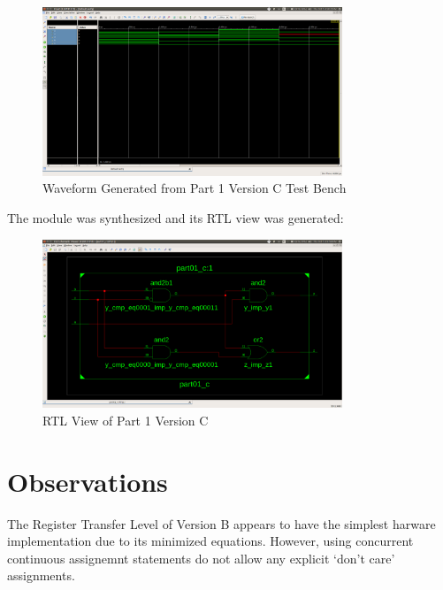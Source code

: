 \documentclass[paper=usletter, fontsize=12pt]{article}
\begin{document}
    \begin{figure}[ht]
        \begin{center}
            \includegraphics[width=0.8\textwidth]{version_c_wav.png}
            \caption{Waveform Generated from Part 1 Version C Test Bench} \label{fig:c_wav}
        \end{center}
    \end{figure}

    The module was synthesized and its RTL view was generated:
    \begin{figure}[ht]
        \begin{center}
            \includegraphics[width=0.8\textwidth]{version_c.png}
            \caption{RTL View of Part 1 Version C} \label{fig:c_rtl}
        \end{center}
    \end{figure}

    \section{Observations}
    The Register Transfer Level of Version B appears to have the simplest harware implementation due to its minimized equations. However, using concurrent continuous assignemnt statements do not allow any explicit `don't care' assignments.
\end{document}

